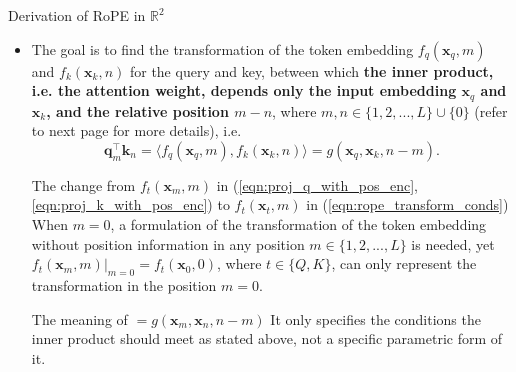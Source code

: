 \documentclass{beamer}
\begin{document}
	\begin{frame}{Derivation of RoPE in $\mathbb{R}^2$}	
		\begin{itemize}
			\item The goal is to find the transformation of the token embedding $f_q(\mathbf{x}_q, m)$ and $f_k(\mathbf{x}_k, n)$ for the query and key, between which \textbf{the inner product, i.e. the attention weight, depends only the input embedding $\mathbf{x}_q$ and $\mathbf{x}_k$, and the relative position $m-n$}, where $m, n \in\{1,2,...,L\} \cup \{0\}$ (refer to next page for more details), i.e. 
			\begin{equation}\label{eqn:rope_transform_conds}
				\mathbf{q}_m^\intercal \mathbf{k}_n = \langle f_q(\mathbf{x}_q, m), f_k(\mathbf{x}_k, n) \rangle = g(\mathbf{x}_q, \mathbf{x}_k, n-m).
			\end{equation}	
			\vfill
			\begin{block}{The change from $f_t(\mathbf{x}_m, m)$ in (\ref{eqn:proj_q_with_pos_enc},\ref{eqn:proj_k_with_pos_enc}) to $f_t(\mathbf{x}_t, m)$ in (\ref{eqn:rope_transform_conds})}
				When $m=0$, a formulation of the transformation of the token embedding without position information in any position $m\in \{1,2,...,L\}$ is needed, yet $f_t(\mathbf{x}_m, m)|_{m=0} = f_t(\mathbf{x}_0, 0)$, where $t\in\{Q,K\}$, can only represent the transformation in the position $m=0$.
			\end{block}
			\begin{block}{The meaning of $ = g(\mathbf{x}_m, \mathbf{x}_n, n-m)$}
				It only specifies the conditions the inner product should meet as stated above, not a specific parametric form of it.
			\end{block}
		\end{itemize}
	\end{frame}
	
\end{document}
